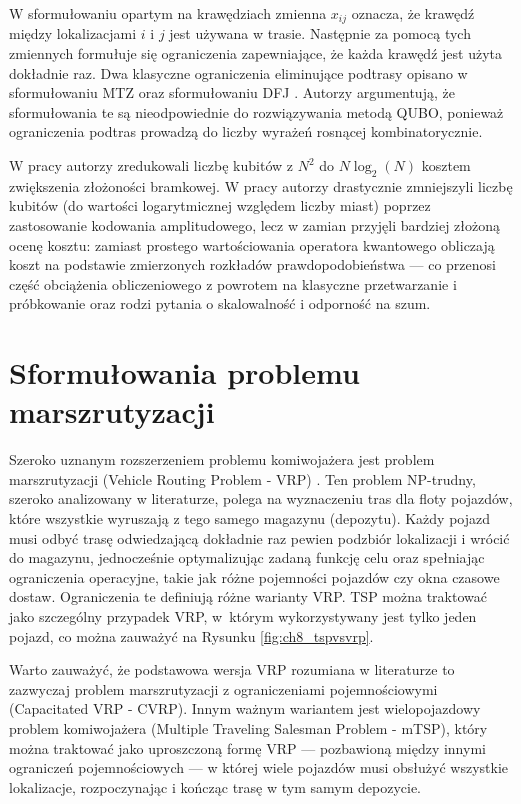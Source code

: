 W sformułowaniu opartym na krawędziach zmienna $x_{ij}$ oznacza, że krawędź między lokalizacjami $i$ i $j$ jest używana w trasie. Następnie za pomocą tych zmiennych formułuje się ograniczenia zapewniające, że każda krawędź jest użyta dokładnie raz. Dwa klasyczne ograniczenia eliminujące podtrasy opisano w sformułowaniu MTZ \cite{mtzformulation} oraz sformułowaniu DFJ \cite{dantzig1954solution}. Autorzy \cite{cattelan2022modelingroutingproblemsqubo} argumentują, że sformułowania te są nieodpowiednie do rozwiązywania metodą QUBO, ponieważ ograniczenia podtras prowadzą do liczby wyrażeń rosnącej kombinatorycznie.

W pracy \cite{ramezani2024reducingnumberqubitsn2} autorzy zredukowali liczbę kubitów z $N^2$ do $N \log_2(N)$ kosztem zwiększenia złożoności bramkowej.
W pracy \cite{amplitude} autorzy drastycznie zmniejszyli liczbę kubitów (do wartości logarytmicznej względem liczby miast) poprzez zastosowanie kodowania amplitudowego, lecz w zamian przyjęli bardziej złożoną ocenę kosztu: zamiast prostego wartościowania operatora kwantowego obliczają koszt na podstawie zmierzonych rozkładów prawdopodobieństwa — co przenosi część obciążenia obliczeniowego z powrotem na klasyczne przetwarzanie i próbkowanie oraz rodzi pytania o skalowalność i odporność na szum.

\section{Sformułowania problemu marszrutyzacji}
Szeroko uznanym rozszerzeniem problemu komiwojażera jest problem marszrutyzacji (Vehicle Routing Problem - VRP) \cite{dantzig1959truck}. Ten problem NP-trudny, szeroko analizowany w literaturze, polega na wyznaczeniu tras dla floty pojazdów, które wszystkie wyruszają z tego samego magazynu (depozytu). Każdy pojazd musi odbyć trasę odwiedzającą dokładnie raz pewien podzbiór lokalizacji i wrócić do magazynu, jednocześnie optymalizując zadaną funkcję celu oraz spełniając ograniczenia operacyjne, takie jak różne pojemności pojazdów czy okna czasowe dostaw. Ograniczenia te definiują różne warianty VRP. TSP można traktować jako szczególny przypadek VRP, w~którym wykorzystywany jest tylko jeden pojazd, co można zauważyć na Rysunku \ref{fig:ch8_tspvsvrp}.

Warto zauważyć, że podstawowa wersja VRP rozumiana w literaturze to zazwyczaj problem marszrutyzacji z ograniczeniami pojemnościowymi (Capacitated VRP - CVRP). Innym ważnym wariantem jest wielopojazdowy problem komiwojażera (Multiple Traveling Salesman Problem - mTSP), który można traktować jako uproszczoną formę VRP — pozbawioną między innymi ograniczeń pojemnościowych — w której wiele pojazdów musi obsłużyć wszystkie lokalizacje, rozpoczynając i kończąc trasę w tym samym depozycie.

